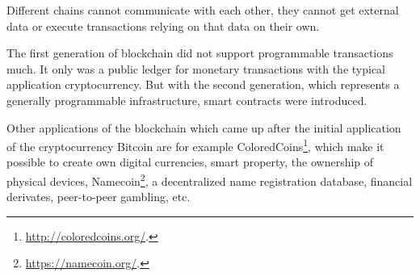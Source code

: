 \documentclass[conference]{IEEEtran}
\begin{document}
Different chains cannot communicate with each other, they cannot get external data or execute transactions relying on that data on their own. \cite{Wang2017} \par 
The first generation of blockchain did not support programmable transactions much. It only was a public ledger for monetary transactions with the typical application cryptocurrency. But with the second generation, which represents a generally programmable infrastructure, smart contracts were introduced. \cite{Xu2016} \par 
Other applications of the blockchain which came up after the initial application of the cryptocurrency Bitcoin are for example ColoredCoins\footnote{\url{http://coloredcoins.org/}.}, which make it possible to create own digital currencies, smart property, the ownership of physical devices, Namecoin\footnote{\url{https://namecoin.org/}.}, a decentralized name registration database, financial derivates, peer-to-peer gambling, etc. \cite{Buterin2014}
\end{document}
